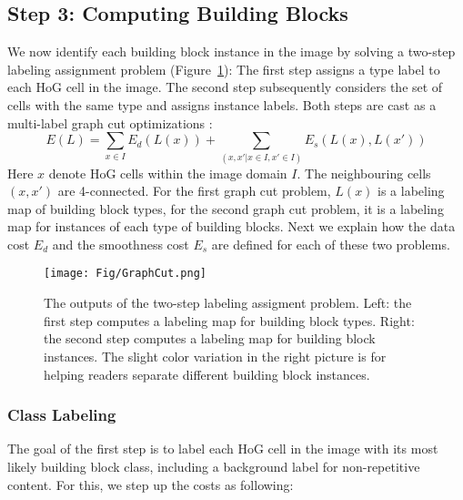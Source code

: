 \documentclass{acmtog}
\begin{document}

\subsection{Step 3: Computing Building Blocks}
\label{sec:ComputingBB}

We now identify each building block instance in the image by solving a two-step labeling assignment problem (Figure~\ref{fig:GraphCut}): The first step assigns a type label to each HoG cell in the image. The second step subsequently considers the set of cells with the same type and assigns instance labels. Both steps are cast as a multi-label graph cut optimizations \cite{BOYKOVpami2001}: 
%
\begin{equation}
E(L) = \sum_{x\in I} E_{d}(L(x)) + \sum_{(x, x'|x\in I, x' \in I)}E_{s}(L(x), L(x'))
\label{eq:GC}
\end{equation}
%
Here $x$ denote HoG cells within the image domain $I$. The neighbouring cells $(x, x')$ are 4-connected. For the first graph cut problem, $L(x)$ is a labeling map of building block types, for the second graph cut problem, it is a labeling map for instances of each type of building blocks. Next we explain how the data cost $E_{d}$ and the smoothness cost $E_{s}$ are defined for each of these two problems.

\begin{figure}[t!]
  \centering
  \texttt{[image: Fig/GraphCut.png]}
  \caption{The outputs of the two-step labeling assigment problem. Left: the first step computes a labeling map for building block types. Right: the second step computes a labeling map for building block instances. The slight color variation in the right picture is for helping readers separate different building block instances.} 
	\label{fig:GraphCut}
\end{figure}


\subsubsection{Class Labeling}

The goal of the first step is to label each HoG cell in the image with its most likely building block class, including a background label for non-repetitive content. For this, we step up the costs as following:
\end{document}
